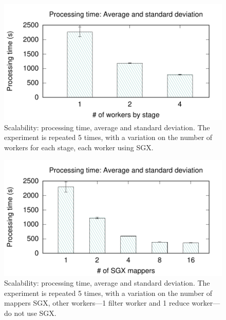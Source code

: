 \begin{figure}[t!]
  \centering  \includegraphics[width=\linewidth]{plots/secure_streams/scalability/sgxfull_scalability}
  \caption{Scalability: processing time, average and standard deviation. The experiment is repeated 5 times, with a variation on the number of workers for each stage, each worker using SGX.}
  \label{fig:scalability:sgxfull}
\end{figure}
\begin{figure}[t!]
  \centering  \includegraphics[width=\linewidth]{plots/secure_streams/scalability/sgxmapper_scalability}
  \caption{Scalability: processing time, average and standard deviation. The experiment is repeated 5 times, with a variation on the number of mappers SGX, other workers---1 filter worker and 1 reduce worker---do not use SGX.}
  \label{fig:scalability:sgxmapper}
\end{figure}





